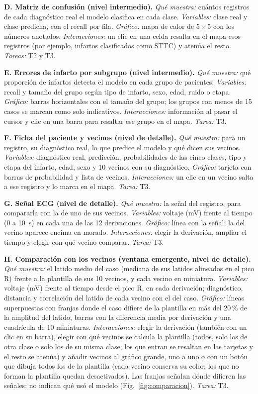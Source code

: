 \documentclass[conference]{IEEEtran}
\begin{document}
\smallskip\noindent\textbf{D. Matriz de confusión (nivel intermedio).} \emph{Qué muestra:} cuántos registros de cada diagnóstico real el modelo clasifica en cada clase. \emph{Variables:} clase real y clase predicha, con el recall por fila. \emph{Gráfico:} mapa de calor de $5\times5$ con los números anotados. \emph{Interacciones:} un clic en una celda resalta en el mapa esos registros (por ejemplo, infartos clasificados como STTC) y atenúa el resto. \emph{Tareas:} T2 y T3.

\smallskip\noindent\textbf{E. Errores de infarto por subgrupo (nivel intermedio).} \emph{Qué muestra:} qué proporción de infartos detecta el modelo en cada grupo de pacientes. \emph{Variables:} recall y tamaño del grupo según tipo de infarto, sexo, edad, ruido o etapa. \emph{Gráfico:} barras horizontales con el tamaño del grupo; los grupos con menos de 15 casos se marcan como solo indicativos. \emph{Interacciones:} información al pasar el cursor y clic en una barra para resaltar ese grupo en el mapa. \emph{Tarea:} T3.

\smallskip\noindent\textbf{F. Ficha del paciente y vecinos (nivel de detalle).} \emph{Qué muestra:} para un registro, su diagnóstico real, lo que predice el modelo y qué dicen sus vecinos. \emph{Variables:} diagnóstico real, predicción, probabilidades de las cinco clases, tipo y etapa del infarto, edad, sexo y 10 vecinos con su diagnóstico. \emph{Gráfico:} tarjeta con barras de probabilidad y lista de vecinos. \emph{Interacciones:} un clic en un vecino salta a ese registro y lo marca en el mapa. \emph{Tarea:} T3.

\smallskip\noindent\textbf{G. Señal ECG (nivel de detalle).} \emph{Qué muestra:} la señal del registro, para compararla con la de uno de sus vecinos. \emph{Variables:} voltaje (mV) frente al tiempo (0 a 10~s) en cada una de las 12 derivaciones. \emph{Gráfico:} línea con la señal; la del vecino aparece encima en morado. \emph{Interacciones:} elegir la derivación, ampliar el tiempo y elegir con qué vecino comparar. \emph{Tarea:} T3.

\smallskip\noindent\textbf{H. Comparación con los vecinos (ventana emergente, nivel de detalle).} \emph{Qué muestra:} el latido medio del caso (mediana de sus latidos alineados en el pico R) frente a la plantilla de sus 10 vecinos, y cada vecino en miniatura. \emph{Variables:} voltaje (mV) frente al tiempo desde el pico R, en cada derivación; diagnóstico, distancia y correlación del latido de cada vecino con el del caso. \emph{Gráfico:} líneas superpuestas con franjas donde el caso difiere de la plantilla en más del 20\,\% de la amplitud del latido, barras con la diferencia media por derivación y una cuadrícula de 10 miniaturas. \emph{Interacciones:} elegir la derivación (también con un clic en su barra), elegir con qué vecinos se calcula la plantilla (todos, solo los de otra clase o solo los de su misma clase; los que entran se resaltan en las tarjetas y el resto se atenúa) y añadir vecinos al gráfico grande, uno a uno o con un botón que dibuja todos los de la plantilla (cada vecino conserva su color; los que no forman la plantilla quedan desactivados). Las franjas señalan dónde difieren las señales; no indican qué usó el modelo (Fig.~\ref{fig:comparacion}). \emph{Tarea:} T3.
\end{document}

